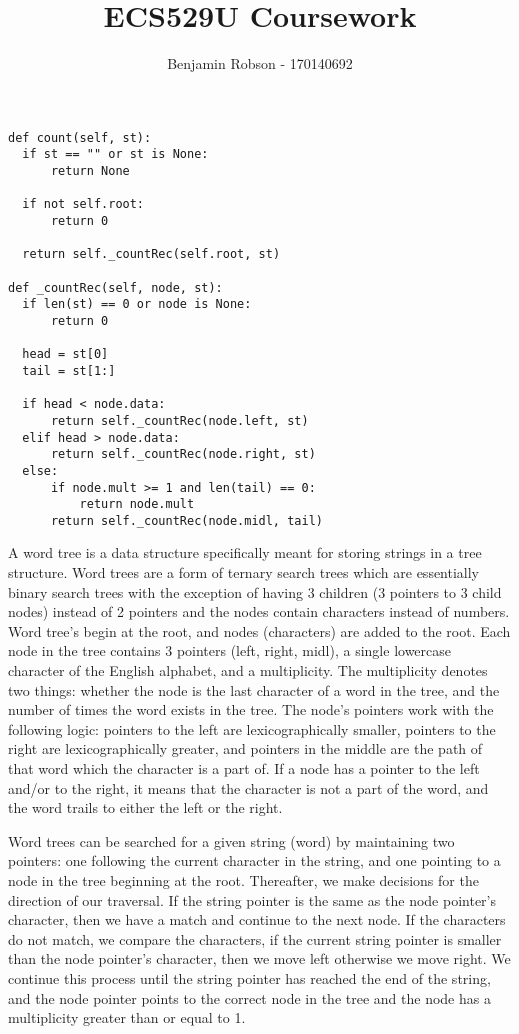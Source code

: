 \documentclass{article}
\title{ECS529U Coursework}
\author{Benjamin Robson - 170140692}
\date{}
\begin{document}
  \maketitle
  \newpage

  \begin{lstlisting}[frame=single, caption={Count function in word tree}, captionpos=b]
def count(self, st):
  if st == "" or st is None: 
      return None
  
  if not self.root:
      return 0

  return self._countRec(self.root, st)

def _countRec(self, node, st):
  if len(st) == 0 or node is None: 
      return 0
  
  head = st[0]
  tail = st[1:]
  
  if head < node.data: 
      return self._countRec(node.left, st)
  elif head > node.data: 
      return self._countRec(node.right, st)
  else:
      if node.mult >= 1 and len(tail) == 0:
          return node.mult
      return self._countRec(node.midl, tail)
  \end{lstlisting}
  \newpage
  A word tree is a data structure specifically meant for storing strings in a tree structure. Word trees are a form of ternary search trees which are essentially binary search trees with the exception of having 3 children (3 pointers to 3 child nodes) instead of 2 pointers and the nodes contain characters instead of numbers. Word tree's begin at the root, and nodes (characters) are added to the root. Each node in the tree contains 3 pointers (left, right, midl), a single lowercase character of the English alphabet, and a multiplicity. The multiplicity denotes two things: whether the node is the last character of a word in the tree, and the number of times the word exists in the tree. The node's pointers work with the following logic: pointers to the left are lexicographically smaller, pointers to the right are lexicographically greater, and pointers in the middle are the path of that word which the character is a part of. If a node has a pointer to the left and/or to the right, it means that the character is not a part of the word, and the word trails to either the left or the right. 

  Word trees can be searched for a given string (word) by maintaining two pointers: one following the current character in the string, and one pointing to a node in the tree beginning at the root. Thereafter, we make decisions for the direction of our traversal. If the string pointer is the same as the node pointer's character, then we have a match and continue to the next node. If the characters do not match, we compare the characters, if the current string pointer is smaller than the node pointer's character, then we move left otherwise we move right. We continue this process until the string pointer has reached the end of the string, and the node pointer points to the correct node in the tree and the node has a multiplicity greater than or equal to 1.
  
\end{document}
